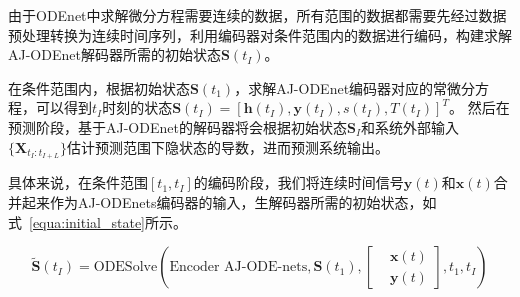 由于ODEnet中求解微分方程需要连续的数据，所有范围的数据都需要先经过数据预处理转换为连续时间序列，利用编码器对条件范围内的数据进行编码，构建求解AJ-ODEnet解码器所需的初始状态$\boldsymbol S(t_I)$。

在条件范围内，根据初始状态$\boldsymbol S(t_1)$，求解AJ-ODEnet编码器对应的常微分方程，可以得到$t_I$时刻的状态$\boldsymbol S(t_I)=[\boldsymbol h(t_I), \boldsymbol y(t_I), s(t_I), T(t_I)]^T$。
然后在预测阶段，基于AJ-ODEnet的解码器将会根据初始状态${\boldsymbol{S}}_I$和系统外部输入$\{{\boldsymbol {X}}_{t_{I}:t_{I+L}}\}$估计预测范围下隐状态的导数，进而预测系统输出。

具体来说，在条件范围$[t_1, t_I]$的编码阶段，我们将连续时间信号$\boldsymbol y(t)$和$\boldsymbol x(t)$合并起来作为AJ-ODEnets编码器的输入，生解码器所需的初始状态，如式~\eqref{equa:initial_state}所示。

\begin{equation}
\boldsymbol{\tilde S}(t_I)=\text{ODESolve}(\text{Encoder AJ-ODE-nets},\boldsymbol S(t_1)
, 
\left [
\begin{aligned} 
&\boldsymbol {x}(t) \\
&\boldsymbol {y}(t)
\end{aligned}
\right ]
, t_1, t_I)
\label{equa:initial_state}
\end{equation}

